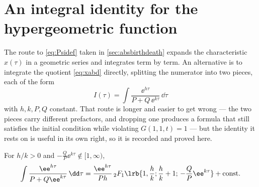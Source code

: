 \renewcommand{\thesection}{\thechapter.\Alph{section}}
\setcounter{section}{0}

\section{An integral identity for the hypergeometric function}
\label{app:hyp}

The route to \cref{eq:Psidef} taken in \cref{sec:absbirthdeath} expands the
characteristic $x(\tau)$ in a geometric series and integrates term by term. An
alternative is to integrate the quotient \cref{eq:xabd} directly, splitting the
numerator into two pieces, each of the form
\begin{equation}
\label{eq:Iform}
I(\tau) = \int\frac{\ee^{h\tau}}{P+Q\,\ee^{k\tau}}\,\dd\tau
\end{equation}
with $h,k,P,Q$ constant. That route is longer and easier to get wrong --- the two
pieces carry different prefactors, and dropping one produces a formula that still
satisfies the initial condition while violating $G(1,1,t)=1$ --- but the identity it
rests on is useful in its own right, so it is recorded and proved here.

\begin{proposition}
\label{prop:hypIden}
For $h/k>0$ and $-\tfrac{Q}{P}\ee^{k\tau}\notin[1,\infty)$,
\begin{equation}
\label{eq:hypIden}
\int\frac{\ee^{h\tau}}{P+Q\ee^{k\tau}}\,\dd\tau
= \frac{\ee^{h\tau}}{Ph}\,{}_2F_1\lrb{1,\frac{h}{k};\frac{h}{k}+1;\,-\frac{Q}{P}\ee^{k\tau}}
+ \text{const} .
\end{equation}
\end{proposition}

